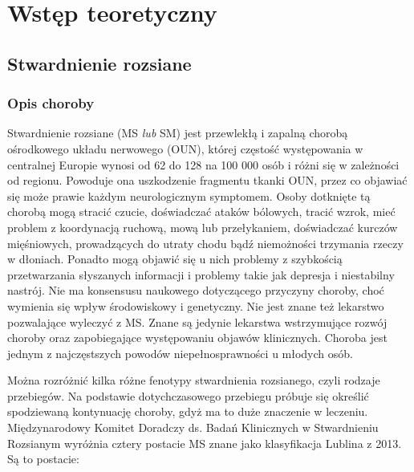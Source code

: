 \section{Wstęp teoretyczny}
\label{sec:TheoreticalIntroduction}

\newcommand{\equ}[1]{{\Large #1}}

\subsection{Stwardnienie rozsiane}
\subsubsection{Opis choroby} 
\label{sec:MSPhenotypes}
Stwardnienie rozsiane (MS \textit{lub} SM)  jest przewlekłą i zapalną chorobą ośrodkowego układu nerwowego (OUN), której częstość występowania w centralnej Europie wynosi od 62 do 128 na 100 000 osób\cite{Kingwell2013} i różni się w zależności od regionu. Powoduje ona uszkodzenie fragmentu tkanki OUN, przez co objawiać się może prawie każdym neurologicznym symptomem. Osoby dotknięte tą chorobą mogą stracić czucie, doświadczać ataków bólowych, tracić wzrok, mieć problem z koordynacją ruchową, mową lub przełykaniem, doświadczać kurczów mięśniowych, prowadzących do utraty chodu bądź niemożności trzymania rzeczy w dłoniach\cite{Gelfand2014}. Ponadto mogą objawić się u nich problemy z szybkością przetwarzania słyszanych informacji i problemy takie jak depresja i niestabilny nastrój\cite{Benedict2020-at}. Nie ma konsensusu naukowego dotyczącego przyczyny choroby, choć wymienia się wpływ środowiskowy i genetyczny. Nie jest znane też lekarstwo pozwalające wyleczyć z MS. Znane są jedynie lekarstwa wstrzymujące rozwój choroby oraz zapobiegające występowaniu objawów klinicznych\cite{Koriem2016}. Choroba jest jednym z najczęstszych powodów niepełnosprawności u młodych osób\cite{Browne2014}.
\par
Można rozróżnić kilka różne fenotypy stwardnienia rozsianego, czyli rodzaje przebiegów. Na podstawie dotychczasowego przebiegu próbuje się określić spodziewaną kontynuację choroby, gdyż ma to duże znaczenie w leczeniu.
Międzynarodowy Komitet Doradczy ds. Badań Klinicznych w Stwardnieniu Rozsianym wyróżnia cztery postacie MS znane jako klasyfikacja Lublina z 2013\cite{Lublin2014-md}. Są to postacie:
